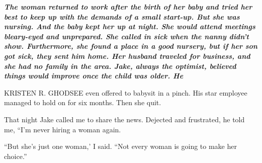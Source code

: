  \par 
\textit\textbf{ {The woman returned to work after the birth of her baby and tried her best to keep up with the demands of a small start-up. But she was nursing. And the baby kept her up at night. She would attend meetings bleary-eyed and unprepared. She called in sick when the nanny didn’t show. Furthermore, she found a place in a good nursery, but if her son got sick, they sent him home. Her husband traveled for business, and she had no family in the area. Jake, always the optimist, believed things would improve once the child was older. He} }
 \par 
KRISTEN R. GHODSEE even offered to babysit in a pinch. His star employee managed to hold on for six months. Then she quit.
 \par 
That night Jake called me to share the news. Dejected and frustrated, he told me, “I’m never hiring a woman again.
 \par 
“But she’s just one woman,’ I said. “Not every woman is going to make her choice.”
 \par 

